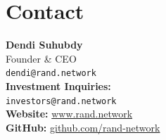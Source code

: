 \documentclass[11pt,a4paper]{article}
\begin{document}
\section{Contact}

\begin{center}
\textbf{Dendi Suhubdy}\\
Founder \& CEO\\
\texttt{dendi@rand.network}\\[1em]

\textbf{Investment Inquiries:}\\
\texttt{investors@rand.network}\\[1em]

\textbf{Website:} \url{www.rand.network}\\
\textbf{GitHub:} \url{github.com/rand-network}
\end{center}

\vfill
\begin{center}
\end{center}
\end{document}
